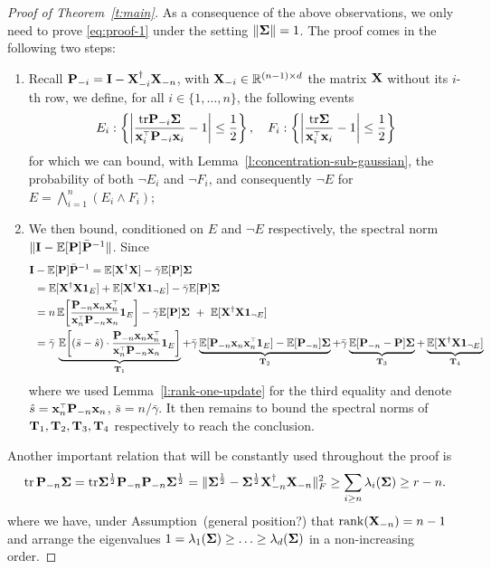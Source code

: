 \documentclass[11pt]{article}
\begin{document}
\begin{proof}[Proof of Theorem~\ref{t:main}]
\bigskip

As a consequence of the above observations, we only need to prove \eqref{eq:proof-1} under the setting $\| \mathbf{\Sigma} \| = 1$. The proof comes in the following two steps:

\begin{enumerate}
  \item Recall $\mathbf P_{-i} = \mathbf I - \mathbf X_{-i}^\dagger \mathbf X_{-n}$, with $\mathbf X_{-i} \in \mathbb R^{(n-1) \times d}$ the matrix $\mathbf X$ without its $i$-th row, we define, for all $i \in \{ 1, \ldots,n \}$, the following events
  \begin{equation}\label{eq:def-events-E-F}
    E_i: \left\{ \left| \frac{\tr \P_{-i} \Sigmab}{\x_i^\top \P_{-i} \x_i} - 1 \right| \le \frac12 \right\}, \quad F_i : \left\{ \left|\frac{\tr \Sigmab}{\x_i^\top \x_i} - 1 \right| \le \frac12  \right\} %
  \end{equation}
  for which we can bound, with Lemma~\ref{l:concentration-sub-gaussian}, the probability of both $\neg E_i$ and $\neg F_i$, and consequently $\neg E$ for $E = \bigwedge_{i=1}^n(E_i \wedge F_i)$;
  \item We then bound, conditioned on $E$ and $\neg E$ respectively, the spectral norm $\| \mathbf I - \mathbb E[\mathbf P] \bar {\mathbf P}^{-1} \|$. Since 
  \begin{align*}
  \I&-\E[\P]\bar\P^{-1}
  = \E[\X^\dagger\X] - \bar\gamma\E[\P]\Sigmab\\
  &= \E[\X^\dagger\X\one_E] +
    \E[\X^\dagger\X \one_{\neg E}]
    -\bar\gamma\E[\P]\Sigmab\\
  &=n\,\E\bigg[\frac{\P_{-n}\x_n\x_n^\top}{\x_n^\top\P_{-n}\x_n}\one_E\bigg]
    -\bar\gamma\E[\P]\Sigmab \ +\     \E[\X^\dagger\X\one_{\neg E}]\\
  &=\bar\gamma\,\underbrace{\E\bigg[(\bar s-\hat
    s)\cdot\frac{\P_{-n}\x_n\x_n^\top}{\x_n^\top\P_{-n}\x_n}\one_E\bigg]}_{\T_1}
    + \bar\gamma \underbrace{\E[\P_{-n}\x_n\x_n^\top\one_E] - \E[\P_{-n}]\Sigmab}_{\T_2} + \bar\gamma \underbrace{\E[\P_{-n}-\P]\Sigmab}_{\T_3} + \underbrace{\E[\X^\dagger\X\one_{\neg E}]}_{\T_4}
\end{align*}
where we used Lemma~\ref{l:rank-one-update} for the third equality and denote $\hat s = \x_n^\top\P_{-n}\x_n$, $\bar s=n/\bar\gamma$. It then remains to bound the spectral norms of $ \mathbf{T}_1, \mathbf{T}_2, \mathbf{T}_3 ,\mathbf{T}_4$ respectively to reach the conclusion.
\end{enumerate}

Another important relation that will be constantly used throughout the proof is
\begin{equation}\label{eq:bound-trace-P-Sigma}
    \mathrm{tr}\,\mathbf P_{-n}\mathbf{\Sigma} = \mathrm{tr} \mathbf{\Sigma}^{\frac12} \mathbf P_{-n} \mathbf P_{-n} \mathbf{\Sigma}^{\frac12} =
    \|\mathbf{\Sigma}^{\frac12}-\mathbf{\Sigma}^{\frac12}\mathbf X_{-n}^\dagger\mathbf X_{-n}\|_F^2\geq
\sum_{i\geq n}\lambda_i (\mathbf{\Sigma})\geq r-n.
\end{equation}
where we have, under Assumption~(general position?) that $\mathrm{rank}(\mathbf X_{-n}) = n-1$ and arrange the eigenvalues $ 1 = \lambda_1(\mathbf{\Sigma}) \ge \ldots \ge \lambda_d(\mathbf{\Sigma})$ in a non-increasing order.


\end{proof}
\end{document}
